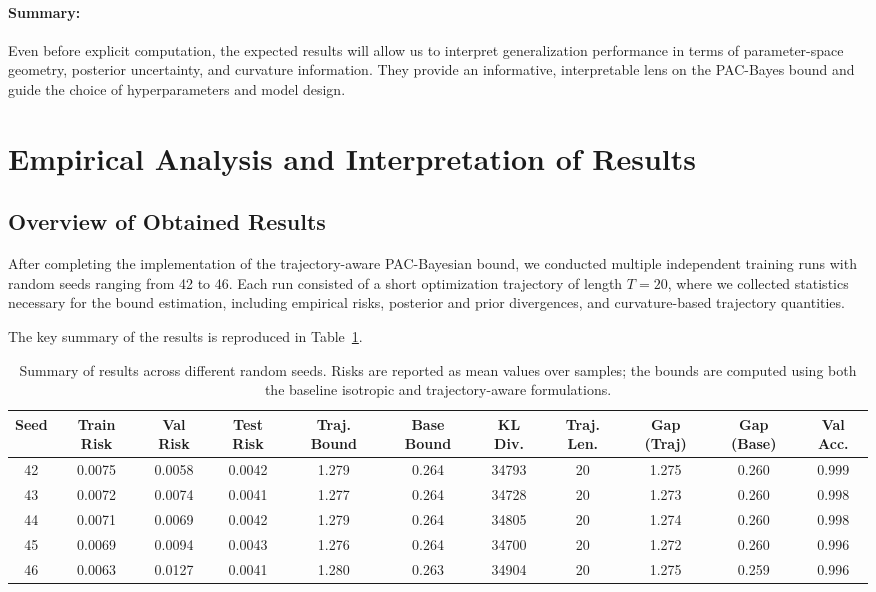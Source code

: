 \paragraph{Summary:}  
Even before explicit computation, the expected results will allow us to interpret generalization performance in terms of parameter-space geometry, posterior uncertainty, and curvature information. They provide an informative, interpretable lens on the PAC-Bayes bound and guide the choice of hyperparameters and model design.

\section{Empirical Analysis and Interpretation of Results}

\subsection{Overview of Obtained Results}

After completing the implementation of the trajectory-aware PAC-Bayesian bound, we conducted multiple independent training runs with random seeds ranging from 42 to 46. Each run consisted of a short optimization trajectory of length $T = 20$, where we collected statistics necessary for the bound estimation, including empirical risks, posterior and prior divergences, and curvature-based trajectory quantities.

The key summary of the results is reproduced in Table~\ref{tab:summary_results}.

\begin{table}[H]
\centering
\caption{Summary of results across different random seeds. Risks are reported as mean values over samples; the bounds are computed using both the baseline isotropic and trajectory-aware formulations.}
\label{tab:summary_results}
\begin{tabular}{ccccccccccc}
\toprule
Seed & Train Risk & Val Risk & Test Risk & Traj. Bound & Base Bound & KL Div. & Traj. Len. & Gap (Traj) & Gap (Base) & Val Acc. \\
\midrule
42 & 0.0075 & 0.0058 & 0.0042 & 1.279 & 0.264 & 34793 & 20 & 1.275 & 0.260 & 0.999 \\
43 & 0.0072 & 0.0074 & 0.0041 & 1.277 & 0.264 & 34728 & 20 & 1.273 & 0.260 & 0.998 \\
44 & 0.0071 & 0.0069 & 0.0042 & 1.279 & 0.264 & 34805 & 20 & 1.274 & 0.260 & 0.998 \\
45 & 0.0069 & 0.0094 & 0.0043 & 1.276 & 0.264 & 34700 & 20 & 1.272 & 0.260 & 0.996 \\
46 & 0.0063 & 0.0127 & 0.0041 & 1.280 & 0.263 & 34904 & 20 & 1.275 & 0.259 & 0.996 \\
\bottomrule
\end{tabular}
\end{table}

